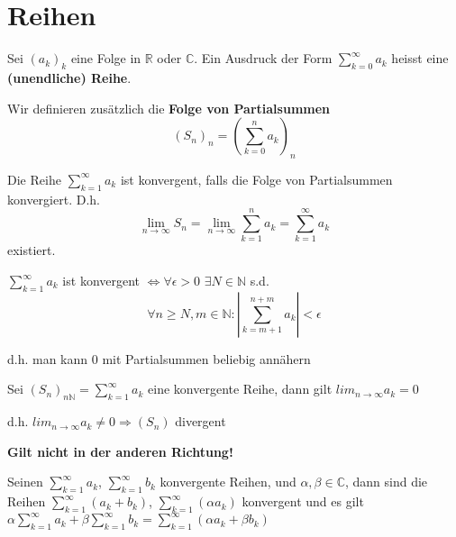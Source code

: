 

\section{Reihen}

\begin{definition}[Reihen]
	Sei $(a_k)_k$ eine Folge in $\mathbb{R}$ oder $\mathbb{C}$.
	Ein Ausdruck der Form $\sum_{k=0}^{\infty}a_k$ heisst eine \textbf{(unendliche) Reihe}.
    
    Wir definieren zusätzlich die \textbf{Folge von Partialsummen} $$(S_n)_n = (\sum_{k=0}^{n} a_k)_n$$
\end{definition}

\begin{definition}
Die Reihe $\sum_{k=1}^{\infty}a_k$ ist konvergent, falls die Folge von Partialsummen konvergiert.
D.h.
$$\lim\limits_{n \rightarrow \infty} S_n = \lim\limits_{n \rightarrow \infty} \sum_{k=1}^{n} a_k = \sum_{k=1}^{\infty}a_k$$
existiert.
\end{definition}

\begin{theorem}
$\sum_{k=1}^{\infty} a_k$ ist konvergent $\Leftrightarrow \forall \epsilon > 0$ $\exists N \in \mathbb{N}$ s.d. $$\forall n \geq N, m\in \mathbb{N} : |\sum_{k=m+1}^{n+m} a_k| < \epsilon$$

d.h. man kann 0 mit Partialsummen beliebig annähern
\end{theorem}

\begin{theorem}
Sei $(S_n)_{n\mathbb{N}} = \sum_{k=1}^{\infty} a_k$ eine konvergente Reihe, dann gilt $lim_{n\rightarrow\infty} a_k = 0$

d.h. $lim_{n\rightarrow\infty} a_k \neq 0 \Rightarrow (S_n)$ divergent

\textbf{Gilt nicht in der anderen Richtung!}
\end{theorem}

\begin{theorem}
Seinen $\sum_{k=1}^\infty a_k$, $\sum_{k=1}^\infty b_k$ konvergente Reihen, und $\alpha, \beta \in \mathbb{C}$, dann sind die Reihen $\sum_{k=1}^\infty (a_k + b_k)$, $\sum_{k=1}^\infty (\alpha a_k)$ konvergent und es gilt $\alpha \sum_{k=1}^\infty a_k + \beta \sum_{k=1}^\infty b_k = \sum_{k=1}^\infty (\alpha a_k + \beta b_k)$
\end{theorem}

